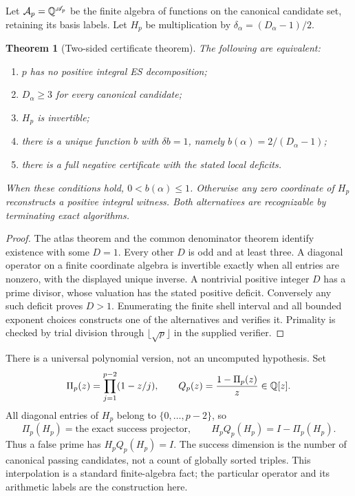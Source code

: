 \documentclass[11pt]{article}
\newtheorem{theorem}{Theorem}[section]
\theoremstyle{definition}\newtheorem{definition}[theorem]{Definition}
\theoremstyle{remark}\newtheorem{remark}[theorem]{Remark}
\begin{document}
Let $\mathcal A_p=\mathbb Q^{\mathscr A_p}$ be the finite algebra of functions on
the canonical candidate set, retaining its basis labels. Let $H_p$ be
multiplication by $\delta_\alpha=(D_\alpha-1)/2$.
\begin{theorem}[Two-sided certificate theorem]\label{thm:dual}
The following are equivalent:
\begin{enumerate}
\item $p$ has no positive integral ES decomposition;
\item $D_\alpha\ge3$ for every canonical candidate;
\item $H_p$ is invertible;
\item there is a unique function $b$ with $\delta b=1$, namely
$b(\alpha)=2/(D_\alpha-1)$;
\item there is a full negative certificate with the stated local deficits.
\end{enumerate}
When these conditions hold, $0<b(\alpha)\le1$. Otherwise any zero coordinate
of $H_p$ reconstructs a positive integral witness. Both alternatives are
recognizable by terminating exact algorithms.
\end{theorem}
\begin{proof}
The atlas theorem and the common denominator theorem identify existence
with some $D=1$. Every other $D$ is odd and at least three. A diagonal
operator on a finite coordinate algebra is invertible exactly when all
entries are nonzero, with the displayed unique inverse. A nontrivial
positive integer $D$ has a prime divisor, whose valuation has the stated
positive deficit. Conversely any such deficit proves $D>1$.
Enumerating the finite shell interval and all bounded exponent choices
constructs one of the alternatives and verifies it. Primality is checked
by trial division through $\lfloor\sqrt p\rfloor$ in the supplied verifier.
\end{proof}

There is a universal polynomial version, not an uncomputed hypothesis.
Set
\[
 \Pi_p(z)=\prod_{j=1}^{p-2}(1-z/j),\qquad
 Q_p(z)=\frac{1-\Pi_p(z)}z\in\mathbb Q[z].
\]
All diagonal entries of $H_p$ belong to $\{0,\ldots,p-2\}$, so
\[
 \Pi_p(H_p)=\text{the exact success projector},\qquad
 H_pQ_p(H_p)=I-\Pi_p(H_p).
\]
Thus a false prime has $H_pQ_p(H_p)=I$. The success dimension is the number
of canonical passing candidates, not a count of globally sorted triples.
This interpolation is a standard finite-algebra fact; the particular
operator and its arithmetic labels are the construction here.
\end{document}
